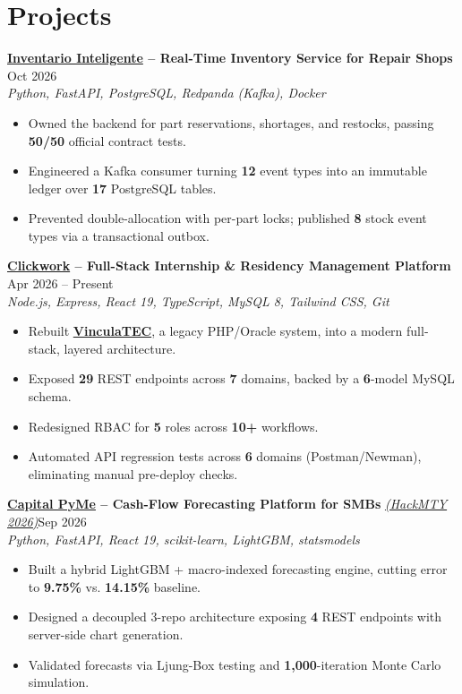 \documentclass[letterpaper,11pt]{article}
\begin{document}
\section{\textbf{Projects}}
\textbf{\href{https://devpost.com/software/inventario-inteligente-noobs404}{Inventario Inteligente} -- Real-Time Inventory Service for Repair Shops} \hfill Oct 2026 \\
\textit{\color{cvblue}Python, FastAPI, PostgreSQL, Redpanda (Kafka), Docker}
\begin{itemize}
    \item Owned the backend for part reservations, shortages, and restocks, passing \textbf{50/50} official contract tests.
    \item Engineered a Kafka consumer turning \textbf{12} event types into an immutable ledger over \textbf{17} PostgreSQL tables.
    \item Prevented double-allocation with per-part locks; published \textbf{8} stock event types via a transactional outbox.
\end{itemize}
\vspace{3pt}
\textbf{\href{https://github.com/MiguelAGDev/clickwork}{Clickwork} -- Full-Stack Internship \& Residency Management Platform} \hfill Apr 2026 -- Present \\
\textit{\color{cvblue}Node.js, Express, React 19, TypeScript, MySQL 8, Tailwind CSS, Git}
\begin{itemize}
    \item Rebuilt \textbf{\href{https://github.com/MiguelAGDev/vinculatec}{VinculaTEC}}, a legacy PHP/Oracle system, into a modern full-stack, layered architecture.
    \item Exposed \textbf{29} REST endpoints across \textbf{7} domains, backed by a \textbf{6}-model MySQL schema.
    \item Redesigned RBAC for \textbf{5} roles across \textbf{10+} workflows.
    \item Automated API regression tests across \textbf{6} domains (Postman/Newman), eliminating manual pre-deploy checks.

\end{itemize}
\vspace{3pt}
\textbf{\href{https://github.com/MiguelAGDev/capital-one}{Capital PyMe} -- Cash-Flow Forecasting Platform for SMBs} \textit{\href{https://hackmty.com/}{(HackMTY 2026)}}\hfill Sep 2026 \\
\textit{\color{cvblue}Python, FastAPI, React 19, scikit-learn, LightGBM, statsmodels}
\begin{itemize}
    \item Built a hybrid LightGBM + macro-indexed forecasting engine, cutting error to \textbf{9.75\%} vs. \textbf{14.15\%} baseline.
    \item Designed a decoupled 3-repo architecture exposing \textbf{4} REST endpoints with server-side chart generation.
    \item Validated forecasts via Ljung-Box testing and \textbf{1,000}-iteration Monte Carlo simulation.
\end{itemize}
\end{document}
